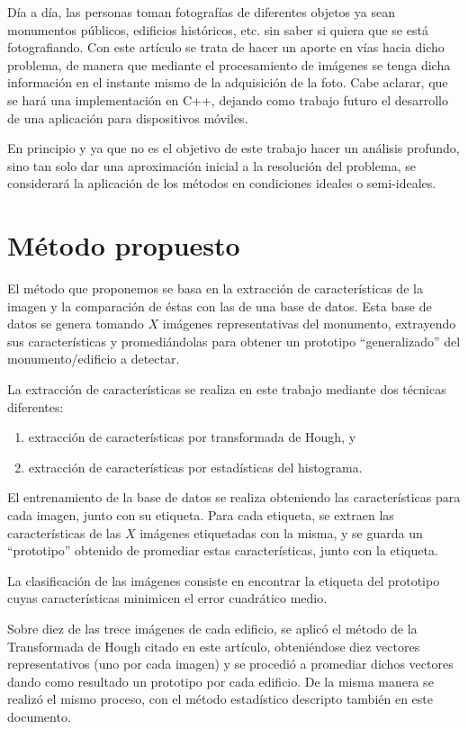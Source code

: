 \documentclass[conference,spanish,a4paper,10pt,oneside,final]{tfmpd}
\begin{document}
Día a día, las personas toman fotografías de diferentes objetos ya sean
monumentos públicos, edificios históricos, etc. sin saber si quiera que se
está fotografiando. Con este artículo se trata de hacer un aporte en vías
hacia dicho problema, de manera que mediante el procesamiento de imágenes se
tenga dicha información en el instante mismo de la adquisición de la foto.
Cabe aclarar, que se hará una implementación en C++, dejando como trabajo
futuro el desarrollo de una aplicación para dispositivos móviles.

En principio y ya que no es el objetivo de este trabajo hacer un análisis
profundo, sino tan solo dar una aproximación inicial a la resolución del
problema, se considerará la aplicación de los métodos en condiciones
ideales o semi-ideales. 
%
%
%
%
\section{Método propuesto}
El método que proponemos se basa en la extracción de características de la
imagen y la comparación de éstas con las de una base de datos.
Esta base de datos se genera tomando $X$ imágenes representativas del monumento,
extrayendo sus características y promediándolas para obtener un prototipo
``generalizado'' del monumento/edificio a detectar.

La extracción de características se realiza en este trabajo mediante dos
técnicas diferentes:
\begin{enumerate}
\item extracción de características por transformada de Hough, y
\item extracción de características por estadísticas del histograma.
\end{enumerate}

El entrenamiento de la base de datos se realiza obteniendo las características
para cada imagen, junto con su etiqueta. Para cada etiqueta, se extraen las
características de las $X$ imágenes etiquetadas con la misma, y se guarda un
``prototipo'' obtenido de promediar estas características, junto con la
etiqueta.

La clasificación de las imágenes consiste en encontrar la etiqueta del
prototipo cuyas características minimicen el error cuadrático medio.

Sobre diez de las trece imágenes de cada edificio, se aplicó el método de la Transformada de Hough citado en este artículo, obteniéndose diez vectores representativos (uno por cada imagen) y se procedió a promediar dichos vectores dando como resultado un prototipo por cada edificio. De la misma manera se realizó el mismo proceso, con el método estadístico descripto también en este documento.
\end{document}
